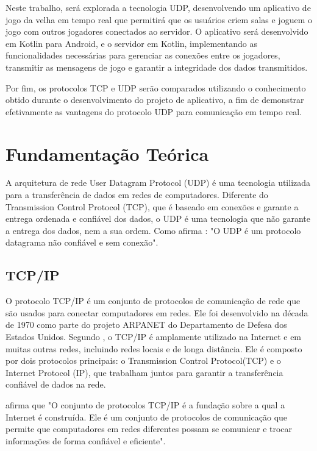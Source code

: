 \documentclass[12pt]{article}
\begin{document}
Neste trabalho, será explorada a tecnologia UDP, desenvolvendo um aplicativo de jogo da velha em tempo real que permitirá que os usuários criem salas e joguem o jogo com outros jogadores conectados ao servidor. O aplicativo será desenvolvido em Kotlin para Android, e o servidor em Kotlin, implementando as funcionalidades necessárias para gerenciar as conexões entre os jogadores, transmitir as mensagens de jogo e garantir a integridade dos dados transmitidos.

Por fim, os protocolos TCP e UDP serão comparados utilizando o conhecimento obtido durante o desenvolvimento do projeto de aplicativo, a fim de demonstrar efetivamente as vantagens do protocolo UDP para comunicação em tempo real.

\section{Fundamentação Teórica} \label{sec:firstpage}

A arquitetura de rede User Datagram Protocol (UDP) é uma tecnologia utilizada para a transferência de dados em redes de computadores. Diferente do Transmission Control Protocol (TCP), que é baseado em conexões e garante a entrega ordenada e confiável dos dados, o UDP é uma tecnologia que não garante a entrega dos dados, nem a sua ordem. Como afirma \cite{kurose2013computer}: "O UDP é um protocolo datagrama não confiável e sem conexão".

\subsection{TCP/IP}
O protocolo TCP/IP é um conjunto de protocolos de comunicação de rede que são usados para conectar computadores em redes. Ele foi desenvolvido na década de 1970 como parte do projeto ARPANET do Departamento de Defesa dos Estados Unidos. Segundo \cite{forouzan2018comunicacao}, o TCP/IP é amplamente utilizado na Internet e em muitas outras redes, incluindo redes locais e de longa distância. Ele é composto por dois protocolos principais: o Transmission Control Protocol(TCP) e o Internet Protocol (IP), que trabalham juntos para garantir a transferência confiável de dados na rede.

\cite{neuman2003redes} afirma que "O conjunto de protocolos TCP/IP é a fundação sobre a qual a Internet é construída. Ele é um conjunto de protocolos de comunicação que permite que computadores em redes diferentes possam se comunicar e trocar informações de forma confiável e eficiente".
\end{document}
